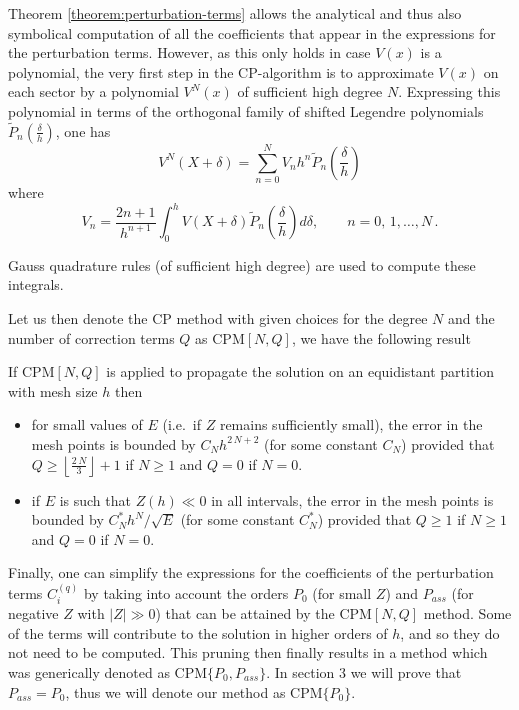 Theorem \ref{theorem:perturbation-terms} allows the analytical and thus also symbolical computation of all the coefficients that appear in the expressions for the perturbation terms.
However, as this only holds in case $V(x)$ is a polynomial, the very first step in the CP-algorithm is to approximate $V(x)$ on each sector by a polynomial $V^{N}(x)$ of sufficient high degree $N$.
Expressing this polynomial in terms of the orthogonal family of shifted Legendre polynomials \(\widetilde{P}_n(\frac{\delta}{h})\),
one has
\[ V^{N}(X+\delta) = \sum_{n=0}^N V_n h^n \widetilde{P}_n(\frac{\delta}{h})  \]
where
\begin{equation} V_n= \frac{2 n +1}{h^{n+1}} \int_0^h V(X+\delta) \widetilde{P}_n(\frac{\delta}{h}) d \delta, \qquad n=0,\,1,\ldots,N \,. \label{eq:Vn}\end{equation}

Gauss quadrature rules (of sufficient high degree) are used to compute these integrals.

Let us then denote the CP method with given choices for the degree $N$ and the number of correction terms $Q$ as CPM$[N,Q]$, we have the  following result \cite{ixaru_cp_1998}

\begin{theorem}\label{theorem:error-estimate}
  If $\text{CPM}[N,Q]$ is applied to propagate the solution on an equidistant partition with mesh size $h$ then
  \begin{itemize}
    \item for small values of $E$ (i.e.\ if $Z$ remains sufficiently small), the error in the mesh points is bounded by $C_N h^{2\,N+2}$ (for some constant $C_N$) provided that $Q \geq \left\lfloor \frac{2\,N}{3} \right\rfloor +1$ if $N \geq 1$ and $Q=0$ if $N=0$.
    \item if $E$ is such that $Z(h)\ll 0$ in all intervals, the error in the mesh points is bounded by $C^*_N h^{N}/ \sqrt{E}$  (for some constant $C^*_N$) provided that $Q \geq 1$  if $N \geq 1$ and $Q=0$ if $N=0$.
  \end{itemize}
\end{theorem}

Finally, one can simplify the expressions for the coefficients of the perturbation terms \(C^{(q)}_i\) by taking into account the orders $P_0$ (for small $Z$) and $P_{ass}$ (for negative $Z$ with $|Z| \gg 0$) that can be attained by the CPM$[N,Q]$ method. Some of the terms will contribute to the solution in higher orders of $h$, and so they do not need to be computed. This pruning then finally results in a method which was generically denoted as CPM$\{P_0, P_{ass}\}$. In section 3 we will prove that $P_{ass} = P_0$, thus we will denote our method as CPM$\{P_0\}$.

